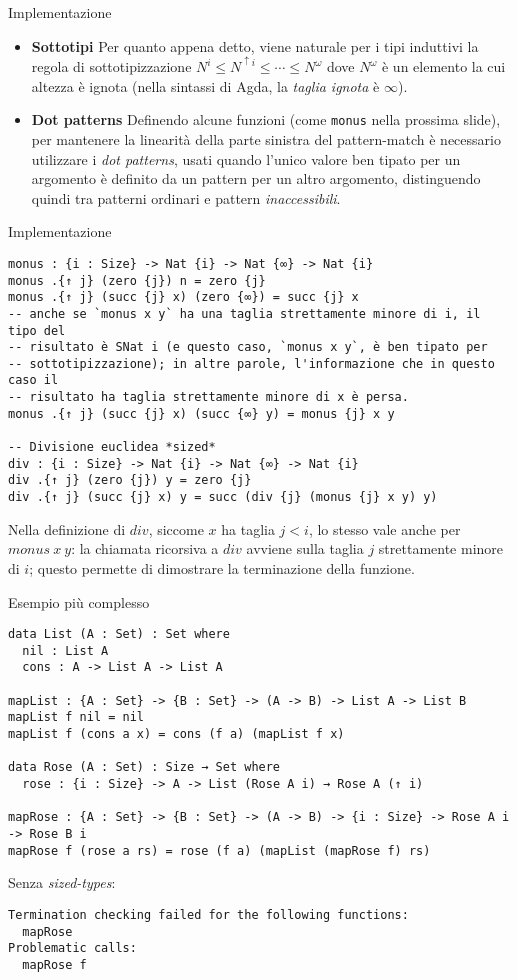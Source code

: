 \documentclass[t,aspectratio=169,10pt]{beamer}
\begin{document}
\begin{frame}{Implementazione}
	\begin{itemize}
		\item {{\bf Sottotipi}
		      Per quanto appena detto, viene naturale per i tipi induttivi la regola
		      di sottotipizzazione $N^i \leq N^{\uparrow i} \leq \cdots \leq
			      N^{\omega}$ dove $N^{\omega}$ è un elemento la cui altezza è ignota
		      (nella sintassi di Agda, la {\it taglia ignota} è $\infty$).
		      }
		\item {{\bf Dot patterns}
		      Definendo alcune funzioni (come \texttt{monus} nella prossima slide),
		      per mantenere la linearità della parte sinistra del pattern-match è
		      necessario utilizzare i {\it dot patterns}, usati quando l'unico valore ben
		      tipato per un argomento è definito da un pattern per un altro argomento,
		      distinguendo quindi tra patterni ordinari e pattern {\it inaccessibili}.
		      }
	\end{itemize}
\end{frame}
\begin{frame}[fragile]{Implementazione}
	\begin{verbatim}
monus : {i : Size} -> Nat {i} -> Nat {∞} -> Nat {i}
monus .{↑ j} (zero {j}) n = zero {j}
monus .{↑ j} (succ {j} x) (zero {∞}) = succ {j} x
-- anche se `monus x y` ha una taglia strettamente minore di i, il tipo del
-- risultato è SNat i (e questo caso, `monus x y`, è ben tipato per
-- sottotipizzazione); in altre parole, l'informazione che in questo caso il
-- risultato ha taglia strettamente minore di x è persa. 
monus .{↑ j} (succ {j} x) (succ {∞} y) = monus {j} x y

-- Divisione euclidea *sized*
div : {i : Size} -> Nat {i} -> Nat {∞} -> Nat {i}
div .{↑ j} (zero {j}) y = zero {j}
div .{↑ j} (succ {j} x) y = succ (div {j} (monus {j} x y) y)
\end{verbatim}
	Nella definizione di $div$, siccome $x$ ha taglia $j < i$, lo stesso vale anche
	per $monus~x~y$: la chiamata ricorsiva a $div$ avviene sulla taglia $j$
	strettamente minore di $i$; questo permette di dimostrare la terminazione della
	funzione.
\end{frame}
\begin{frame}[fragile]{Esempio più complesso}
	\begin{verbatim}
data List (A : Set) : Set where
  nil : List A 
  cons : A -> List A -> List A

mapList : {A : Set} -> {B : Set} -> (A -> B) -> List A -> List B
mapList f nil = nil 
mapList f (cons a x) = cons (f a) (mapList f x)

data Rose (A : Set) : Size → Set where
  rose : {i : Size} -> A -> List (Rose A i) → Rose A (↑ i)

mapRose : {A : Set} -> {B : Set} -> (A -> B) -> {i : Size} -> Rose A i -> Rose B i
mapRose f (rose a rs) = rose (f a) (mapList (mapRose f) rs)
\end{verbatim}
	Senza {\it sized-types}:
	\begin{verbatim}
Termination checking failed for the following functions:
  mapRose
Problematic calls:
  mapRose f
\end{verbatim}
\end{frame}
\end{document}

